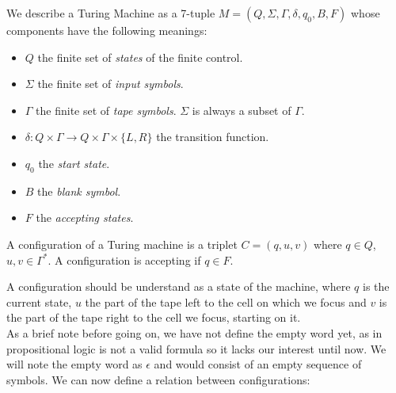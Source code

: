 \begin{definition} We describe a Turing Machine as a 7-tuple $M=(Q, \Sigma, \Gamma, \delta, q_0, B, F)$ whose components have the following meanings:
  \begin{itemize}
  \item $Q$ the finite set of \emph{states} of the finite control.
  \item $\Sigma$ the finite set of \emph{input symbols}.
  \item $\Gamma$ the finite set of \emph{tape symbols}. $\Sigma$ is always a subset of $\Gamma$.
  \item  $\delta: Q\times \Gamma \to Q\times\Gamma\times\{L,R\}$ the transition function.
  \item $q_0$ the \emph{start state}.
  \item $B$ the \emph{blank symbol}.
  \item $F$ the \emph{accepting states}.
  \end{itemize}

  A configuration of a Turing machine is a triplet $C=(q,u,v)$ where $q\in Q$, $u,v\in \Gamma^*$. A configuration is accepting if $q\in F$.
\end{definition}

A configuration should be understand as a state of the machine, where $q$ is the current state, $u$ the part of the tape left to the cell on which we focus and $v$ is the part of the tape right to the cell we focus, starting on it.\\

As a brief note before going on, we have not define the empty word yet, as in propositional logic is not a valid formula so it lacks our interest until now. We will note the empty word as $\epsilon$ and would consist of an empty sequence of symbols. We can  now define a relation between configurations:

